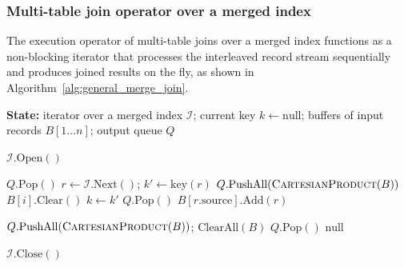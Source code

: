 \documentclass[sigconf, pdfa, nonacm]{acmart}
\begin{document}
\subsubsection{Multi-table join operator over a merged index}\label{sssec:multi_table_join_operator}

The execution operator of multi-table joins over a merged index functions as a non-blocking iterator that processes the interleaved record stream sequentially and produces joined results on the fly, as shown in Algorithm~\ref{alg:general_merge_join}.

\begin{algorithm}[htbp]
    \renewcommand{\algorithmiccomment}[1]{\hfill // \textit{#1}}
    \small
    \algrenewcommand\algorithmicindent{1em}
    \caption{Multi-Table Join Operator over Merged Index}\label{alg:general_merge_join}
    \begin{algorithmic}[1]
        \Statex \textbf{State:} iterator over a merged index \(\mathcal{I}\); current key \(k \gets \text{null}\); buffers of input records \(B[1 \ldots n]\); output queue \(Q\)

            \State \(\mathcal{I}.\text{Open}()\)
        \EndProcedure

             \Return \(Q.\text{Pop}()\) \EndIf
                \State \(r \leftarrow \mathcal{I}.\text{Next}()\); \(k' \leftarrow \text{key}(r)\)
                 
                    \State \(Q.\text{PushAll}(\textsc{CartesianProduct}(B))\)
                            \State \(B[i].\text{Clear}()\) 
                        \EndIf
                    \EndFor
                    \State \(k \leftarrow k'\)
                     \Return \(Q.\text{Pop}()\) \EndIf
                \EndIf
                \State \(B[r.\text{source}].\text{Add}(r)\)
            \EndWhile

                \State \(Q.\text{PushAll}(\textsc{CartesianProduct}(B))\); \(\text{ClearAll}(B)\)
                 \Return \(Q.\text{Pop}()\) \EndIf
            \EndIf
            \Return \(\text{null}\)
        \EndFunction

            \State \(\mathcal{I}.\text{Close}()\)
        \EndProcedure
    \end{algorithmic}
\end{algorithm}
\end{document}
